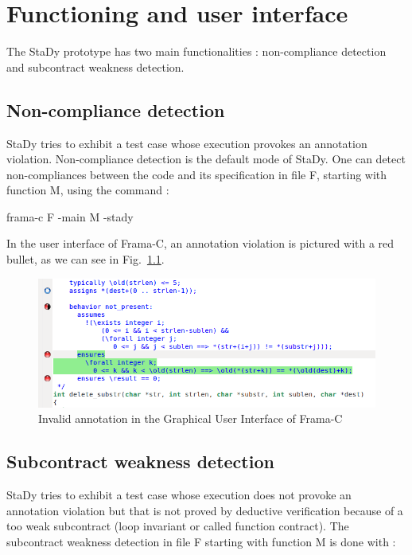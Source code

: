 \documentclass[web]{frama-c-book}
\begin{document}

\chapter{Functioning and user interface}

The StaDy prototype has two main functionalities : non-compliance detection and subcontract weakness detection.

\section{Non-compliance detection}

StaDy tries to exhibit a test case whose execution provokes an annotation violation. Non-compliance detection is the default mode of StaDy. One can detect non-compliances between the code and its specification in file F, starting with function M, using the command :

\begin{shell}
frama-c F -main M -stady
\end{shell}

In the user interface of Frama-C, an annotation violation is pictured with a red bullet, as we can see in Fig.~\ref{fig:gui}.

\begin{figure}\centering
  \includegraphics[scale=.4]{ppt_invalid.png}
  \caption{Invalid annotation in the Graphical User Interface of Frama-C
    \label{fig:gui}}
\end{figure}

\section{Subcontract weakness detection}

StaDy tries to exhibit a test case whose execution does not provoke an annotation violation but that is not proved by deductive verification because of a too weak subcontract (loop invariant or called function contract). The subcontract weakness detection in file F starting with function M is done with :
\end{document}
